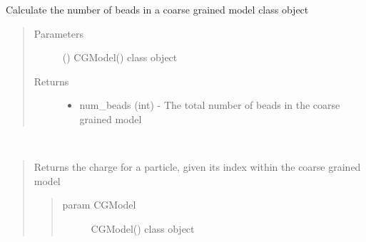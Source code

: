 \documentclass[letterpaper,12pt,english,openany,oneside]{sphinxmanual}
\begin{document}
\begin{fulllineitems}
\begin{fulllineitems}
\begin{quote}
\begin{description}
\begin{itemize}
\end{itemize}


\end{description}\end{quote}

\end{fulllineitems}


\begin{fulllineitems}
\label{\detokenize{cg_model:cg_model.cgmodel.CGModel.get_num_beads}}
Calculate the number of beads in a coarse grained model class object
\begin{quote}\begin{description}
\item[{Parameters}] \leavevmode
{} () \textendash{} CGModel() class object

\item[{Returns}] \leavevmode
\begin{itemize}
\item {} 
num\_beads (int) - The total number of beads in the coarse grained model

\end{itemize}


\end{description}\end{quote}

\end{fulllineitems}


\begin{fulllineitems}
\label{\detokenize{cg_model:cg_model.cgmodel.CGModel.get_particle_charge}}~\begin{quote}

Returns the charge for a particle, given its index within the coarse grained model
\begin{quote}\begin{description}
\item[{param CGModel}] \leavevmode
CGModel() class object


\end{description}
\end{quote}
\end{quote}
\end{fulllineitems}
\end{fulllineitems}
\end{document}
